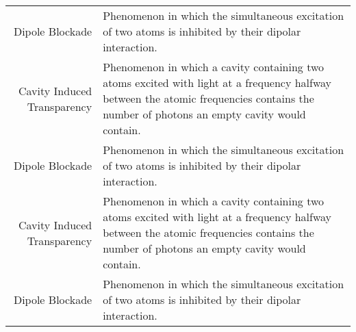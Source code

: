 \begin{center}
\begin{longtable}{r p{}}
Dipole Blockade & Phenomenon in which the simultaneous excitation of two atoms is inhibited by their dipolar interaction. \\
Cavity Induced Transparency & Phenomenon in which a cavity containing two atoms excited with light at a frequency halfway between the atomic frequencies contains the number of photons an empty cavity would contain.  \\ 
Dipole Blockade & Phenomenon in which the simultaneous excitation of two atoms is inhibited by their dipolar interaction. \\
Cavity Induced Transparency & Phenomenon in which a cavity containing two atoms excited with light at a frequency halfway between the atomic frequencies contains the number of photons an empty cavity would contain.  \\ 
Dipole Blockade & Phenomenon in which the simultaneous excitation of two atoms is inhibited by their dipolar interaction.
\end{longtable}
\end{center}
